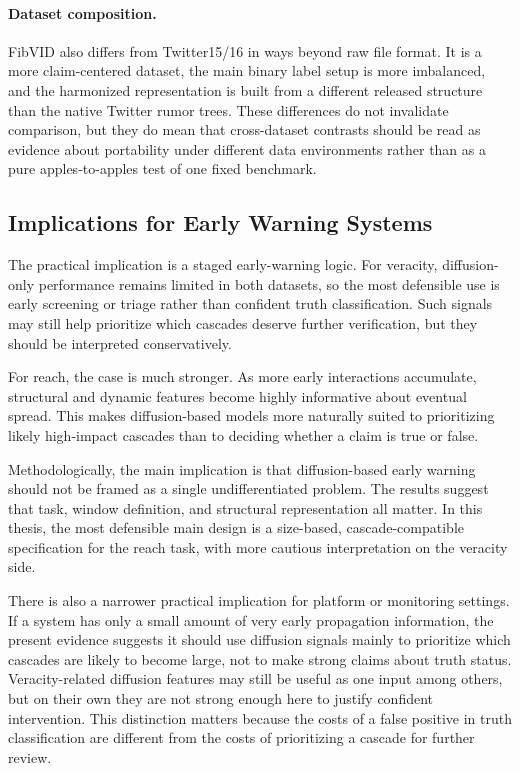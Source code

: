 \paragraph{Dataset composition.}
FibVID also differs from Twitter15/16 in ways beyond raw file format. It is a more claim-centered dataset, the main binary label setup is more imbalanced, and the harmonized representation is built from a different released structure than the native Twitter rumor trees. These differences do not invalidate comparison, but they do mean that cross-dataset contrasts should be read as evidence about portability under different data environments rather than as a pure apples-to-apples test of one fixed benchmark.

\subsection{Implications for Early Warning Systems}
The practical implication is a staged early-warning logic. For veracity, diffusion-only performance remains limited in both datasets, so the most defensible use is early screening or triage rather than confident truth classification. Such signals may still help prioritize which cascades deserve further verification, but they should be interpreted conservatively.

For reach, the case is much stronger. As more early interactions accumulate, structural and dynamic features become highly informative about eventual spread. This makes diffusion-based models more naturally suited to prioritizing likely high-impact cascades than to deciding whether a claim is true or false.

Methodologically, the main implication is that diffusion-based early warning should not be framed as a single undifferentiated problem. The results suggest that task, window definition, and structural representation all matter. In this thesis, the most defensible main design is a size-based, cascade-compatible specification for the reach task, with more cautious interpretation on the veracity side.

There is also a narrower practical implication for platform or monitoring settings. If a system has only a small amount of very early propagation information, the present evidence suggests it should use diffusion signals mainly to prioritize which cascades are likely to become large, not to make strong claims about truth status. Veracity-related diffusion features may still be useful as one input among others, but on their own they are not strong enough here to justify confident intervention. This distinction matters because the costs of a false positive in truth classification are different from the costs of prioritizing a cascade for further review.

